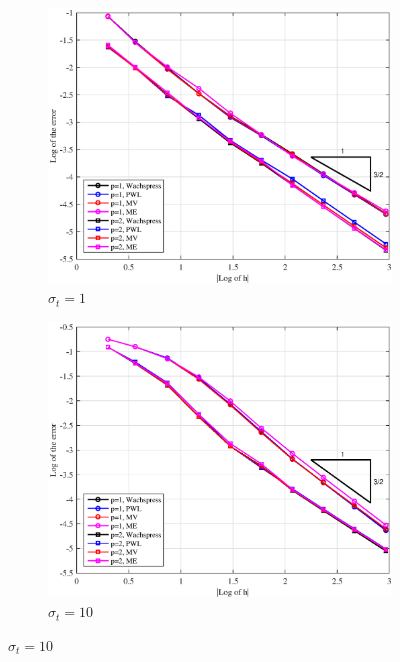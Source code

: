 \begin{figure}
\centering
{
	\begin{subfigure}[b]{0.485\textwidth}
		\centering
		\label{subfig::PA_LeftTop_Poly_sig1}
		\includegraphics[width=\textwidth]{figures/sec_BF/PAErr_LeftTop_Poly_sig1.eps}
	\caption{$\sigma_t = 1$}
	\end{subfigure}
	\hfill
	\begin{subfigure}[b]{0.485\textwidth}
		\centering
		\label{subfig::PA_LeftTop_Poly_sig10}
		\includegraphics[width=\textwidth]{figures/sec_BF/PAErr_LeftTop_Poly_sig10.eps}
	\caption{$\sigma_t = 10$}
	\end{subfigure}
}
\end{figure}
